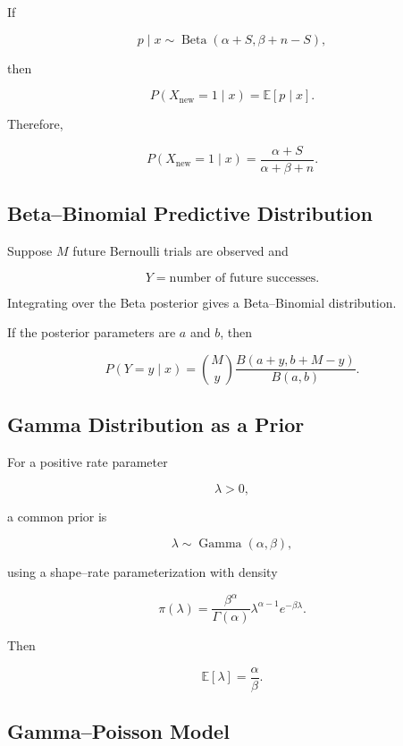If

\[
p\mid x
\sim
\operatorname{Beta}
(
\alpha+S,
\beta+n-S
),
\]

then

\[
P
(
X_{\text{new}}=1
\mid x
)
=
\mathbb{E}[p\mid x].
\]

Therefore,

\[
\boxed{
P
(
X_{\text{new}}=1
\mid x
)
=
\frac{
\alpha+S
}{
\alpha+\beta+n
}.
}
\]

\subsection{Beta--Binomial Predictive Distribution}
\label{subsec:beta-binomial-predictive}

Suppose \(M\) future Bernoulli trials are observed and

\[
Y
=
\text{number of future successes}.
\]

Integrating over the Beta posterior gives a Beta--Binomial distribution.

If the posterior parameters are \(a\) and \(b\), then

\[
\boxed{
P(Y=y\mid x)
=
\binom{M}{y}
\frac{
B(a+y,b+M-y)
}{
B(a,b)
}.
}
\]

\subsection{Gamma Distribution as a Prior}
\label{subsec:gamma-prior}

For a positive rate parameter

\[
\lambda>0,
\]

a common prior is

\[
\boxed{
\lambda
\sim
\operatorname{Gamma}(\alpha,\beta),
}
\]

using a shape--rate parameterization with density

\[
\boxed{
\pi(\lambda)
=
\frac{
\beta^\alpha
}{
\Gamma(\alpha)
}
\lambda^{\alpha-1}
e^{-\beta\lambda}.
}
\]

Then

\[
\boxed{
\mathbb{E}[\lambda]
=
\frac{\alpha}{\beta}.
}
\]

\subsection{Gamma--Poisson Model}
\label{subsec:gamma-poisson-model}

